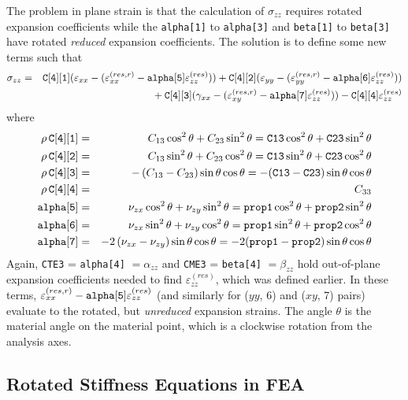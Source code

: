 \documentclass[11pt]{article}
\def\a#1{\alpha_{#1}}
\def\b#1{\beta_{#1}}
\def\code#1{{\small\tt #1}}
\def\e#1{\varepsilon_{#1}}
\def\er#1{\varepsilon_{#1}^{(res)}}
\def\err#1{\varepsilon_{#1}^{(res,r)}}
\def\g#1{\gamma_{#1}}
\def\s#1{\sigma_{#1}}
\def\v#1{\nu_{#1}}
\begin{document}
The problem in plane strain is that the calculation of $\s{zz}$ requires rotated expansion coefficients while the \code{alpha[1]} to \code{alpha[3]}  and \code{beta[1]} to \code{beta[3]} have rotated {\em reduced\/} expansion coefficients. The solution is to define some new terms such that
\begin{eqnarray}
     \s{zz} & = & \code{C[4][1]} (\e{xx} -(\err{xx}-\code{alpha[5]}\er{zz}))
                         +  \code{C[4][2]}(\e{yy} -(\err{yy}-\code{alpha[6]}\er{zz})) 
     \nonumber \\
     && \qquad\qquad\mbox{}
                 + \code{C[4][3]}(\g{xx}-(\err{xy}-\code{alpha[7]}\er{zz}))  - \code{C[4][4]} \er{zz}
\end{eqnarray}
where
\begin{eqnarray}
 \rho\thinspace \code{C[4][1]} & = &C_{13}\cos^2\theta + C_{23}\sin^2\theta
            = \code{C13}\cos^2\theta + \code{C23}\sin^2\theta  \\
 \rho\thinspace \code{C[4][2]} & = &C_{13}\sin^2\theta + C_{23}\cos^2\theta
             = \code{C13}\sin^2\theta + \code{C23}\cos^2\theta  \\
 \rho\thinspace \code{C[4][3]} & = & - \left(C_{13} - C_{23}\right)\sin\theta\cos\theta
             =  -(\code{C13}-\code{C23})\sin\theta\cos\theta \\
 \rho\thinspace \code{C[4][4]} & = & C_{33}  \\
  \code{alpha[5]} & = &\v{zx}\cos^2\theta + \v{zy}\sin^2\theta
         = \code{prop1}\cos^2\theta + \code{prop2}\sin^2\theta  \\
  \code{alpha[6]} & = &\v{zx}\sin^2\theta + \v{zy}\cos^2\theta
        = \code{prop1}\sin^2\theta + \code{prop2}\cos^2\theta  \\
  \code{alpha[7]} & = & - 2\left(\v{zx} - \v{zy}\right)\sin\theta\cos\theta 
       =  -2(\code{prop1}-\code{prop2})\sin\theta\cos\theta
\end{eqnarray}
Again, \code{CTE3} = \code{alpha[4]} $=\a{zz}$ and \code{CME3} = \code{beta[4]} $=\b{zz}$ hold out-of-plane expansion coefficients needed to find $\er{zz}$, which was defined earlier.
In these terms, $\err{xx}-\code{alpha[5]}\er{zz}$ (and similarly for ($yy$, 6) and ($xy$, 7) pairs) evaluate to the rotated, but {\em unreduced\/} expansion strains. The angle $\theta$ is the material angle on the material point, which is a clockwise rotation from the analysis axes.

\subsection{Rotated Stiffness Equations in FEA}
\end{document}
